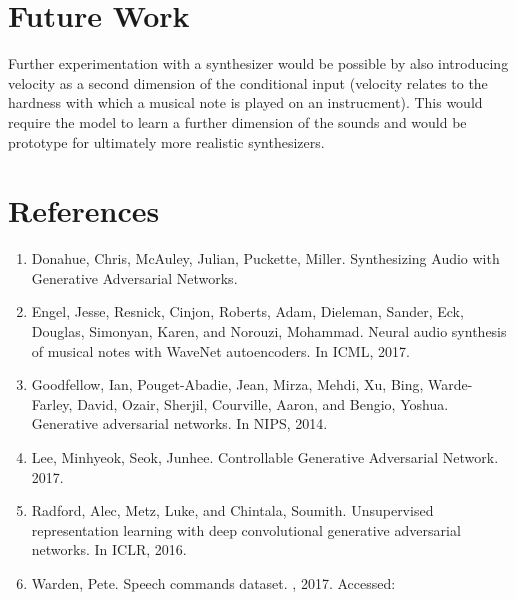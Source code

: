 \documentclass{article}
\begin{document}
\section{Future Work}

Further experimentation with a synthesizer would be possible by also introducing velocity as a second dimension of the conditional input (velocity relates to the hardness with which a musical note is played on an instrucment).
This would require the model to learn a further dimension of the sounds and would be prototype for ultimately more realistic synthesizers.

\section{References}

\begin{enumerate}

\item
  Donahue, Chris, McAuley, Julian, Puckette, Miller. Synthesizing Audio with Generative Adversarial Networks.
\item
  Engel, Jesse, Resnick, Cinjon, Roberts, Adam, Dieleman, Sander, Eck, Douglas, Simonyan, Karen, and Norouzi, Mohammad. Neural audio synthesis of musical notes with WaveNet autoencoders. In ICML, 2017.
\item
  Goodfellow, Ian, Pouget-Abadie, Jean, Mirza, Mehdi, Xu, Bing, Warde-Farley, David, Ozair, Sherjil, Courville, Aaron, and Bengio, Yoshua. Generative adversarial networks. In NIPS, 2014.
\item
  Lee, Minhyeok, Seok, Junhee. Controllable Generative Adversarial Network. 2017.
\item
  Radford, Alec, Metz, Luke, and Chintala, Soumith. Unsupervised representation learning with deep convolutional generative adversarial networks. In ICLR, 2016.
\item
  Warden, Pete. Speech commands dataset.
, 2017.
Accessed:

\end{enumerate}

\end{document}
